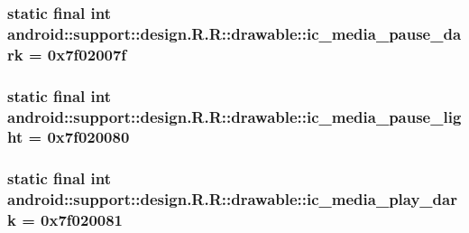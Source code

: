 \hypertarget{classandroid_1_1support_1_1design_1_1_r_1_1drawable_da3ef6e4dc7e1982fa3ac54a4d33e2e0}{
\subsubsection[{ic\_\-media\_\-pause\_\-dark}]{\setlength{\rightskip}{0pt plus 5cm}static final int android::support::design.R.R::drawable::ic\_\-media\_\-pause\_\-dark = 0x7f02007f}}
\label{classandroid_1_1support_1_1design_1_1_r_1_1drawable_da3ef6e4dc7e1982fa3ac54a4d33e2e0}


\hypertarget{classandroid_1_1support_1_1design_1_1_r_1_1drawable_7da475083451e9deb2e0cfc30656b207}{
\subsubsection[{ic\_\-media\_\-pause\_\-light}]{\setlength{\rightskip}{0pt plus 5cm}static final int android::support::design.R.R::drawable::ic\_\-media\_\-pause\_\-light = 0x7f020080}}
\label{classandroid_1_1support_1_1design_1_1_r_1_1drawable_7da475083451e9deb2e0cfc30656b207}


\hypertarget{classandroid_1_1support_1_1design_1_1_r_1_1drawable_f41bed49d0e0f37bfd012f462713df86}{
\subsubsection[{ic\_\-media\_\-play\_\-dark}]{\setlength{\rightskip}{0pt plus 5cm}static final int android::support::design.R.R::drawable::ic\_\-media\_\-play\_\-dark = 0x7f020081}}
\label{classandroid_1_1support_1_1design_1_1_r_1_1drawable_f41bed49d0e0f37bfd012f462713df86}


